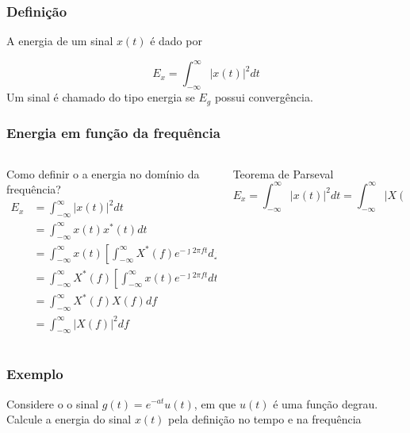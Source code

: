 \documentclass[10pt,hyperref={pdfpagemode=FullScreen},aspectratio=169]{beamer}
\begin{document}
\begin{frame}
  \frametitle{ Definição }

   A energia de um sinal $x(t)$ é dado por 
  
  $$
  E_x = \int _{-\infty}^{\infty} |x(t)|^2 dt
  $$
  Um sinal é chamado do tipo energia se $E_g$ possui convergência.
\end{frame}


\begin{frame}
  \frametitle{Energia em função da frequência}

\begin{columns}[T]
  \begin{column}{0.5\textwidth}
    \begin{block}{Como definir o a energia no domínio da frequência?
      }
      \begin{align*}
        E_x & = \int _{-\infty}^{\infty} |x(t)|^2 dt \\
            & = \int _{-\infty}^{\infty} x(t)x^*(t) dt \\
            & = \int  _{-\infty}^{\infty} x(t) \left[  \int  _{-\infty}^{\infty}X^*(f) e^{-\jmath 2 \pi f t} df \right] dt \\
            & = \int  _{-\infty}^{\infty} X^*(f) \left[  \int  _{-\infty}^{\infty}x(t)  e^{-\jmath 2 \pi f t} dt \right] df \\
            & = \int  _{-\infty}^{\infty} X^*(f) X(f) df \\
            & = \int  _{-\infty}^{\infty} |X(f)|^2 df 
        \end{align*}
        
    \end{block}
    
  \end{column}
  \begin{column}{0.5\textwidth}
    \begin{block}{Teorema de Parseval}
      $$ E_x = \int _{-\infty}^{\infty} |x(t)|^2 dt = \int  _{-\infty}^{\infty} |X(f)|^2 df $$
    \end{block}

  \end{column}
\end{columns}

\end{frame}

\begin{frame}
  \frametitle{Exemplo}

  Considere o o sinal $g(t) = e^{-at} u(t)$, em que $u(t)$ é uma função degrau. Calcule a energia do sinal $x(t)$ pela definição no tempo e na frequência

\end{frame}
\end{document}
